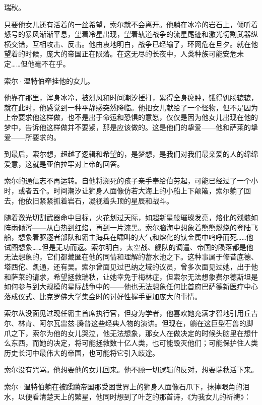 \documentclass[AutoFakeBold=true]{book}
\begin{document}
{\kaishu 瑞秋。}

只要他女儿还有活着的一丝希望，索尔就不会离开。他躺在冰冷的岩石上，倾听着怒号的暴风渐渐平息，望着冷星出现，望着轨道战争的流星尾迹和激光切割武器纵横交错，互相攻击、反击。他由衷地明白，战争已经输了，环网危在旦夕。就在他望着的时候，庞大的帝国正在陨落。在这无尽的长夜中，人类种族可能安危未定……但他毫不在乎。

索尔·温特伯牵挂他的女儿。

他靠在那里，浑身冰冷，被烈风和时间潮汐捶打，累得全身瘀肿，饿得饥肠辘辘，就在此时，他感觉到一种平静感突然降临。他把女儿献给了一个怪物，但不是因为上帝要求他这样做，也不是出于命运和恐惧的意愿，仅仅是因为他女儿出现在他的梦中，告诉他这样做并不要紧，那是应该做的。这是他们的挚爱——他和萨莱的挚爱——所要求的。

{\kaishu 到最后，索尔想，超越了逻辑和希望的，是梦想，是我们对我们最亲爱的人的绵绵爱意，这就是亚伯拉罕对上帝的回答。}

索尔的通信志不再运转。自他将濒死的孩子亲手奉给伯劳起，可能已经过了一个小时，或者五个。时间潮汐让狮身人面像仿若大海上的小船上下颠簸，索尔躺了回去，他依旧紧紧抓着岩石，凝视着头顶的星辰和战斗。

随着激光切割武器命中目标，火花划过天际，如超新星般璀璨发亮，熔化的残骸如阵雨倾泻——从白热到红焰，再到一片漆黑。索尔脑海中想象着熊熊燃烧的登陆飞船，想象着驱逐者部队和霸主海兵在啸叫的大气和熔化的钛金属中呜呼而死……他试图想象……但是无功而返。索尔明白，太空战、舰队的调遣、帝国的陨落都是他无法想象的，它们都藏匿在他的同情和理解的蓄水池之下。这种事属于修昔底德、塔西佗、凯通，还有吴。索尔曾面见过巴纳之域的议员，曾多次面见过她，出于他和萨莱的请求，希望拯救瑞秋，让她幸免于梅林症，但索尔无法想象费尔德斯坦是如何参与到大规模的星际战争中的——他也无法想象任何比首府巴萨德新医疗中心落成仪式、比克罗佛大学集会时的讨好性握手更加庞大的事情。

索尔从没面见过现任霸主首席执行官，但身为学者，他喜欢她充满才智地引用丘吉尔、林肯、阿尔瓦雷兹-腾普这些经典人物的演讲。但现在，躺在这巨型石兽的脚爪之下，索尔为他的女儿哭泣，他无法想象，那女人在做决定的时候头脑里在想什么东西，而她的决定，将可能拯救数十亿人类，也可能毁灭他们；可能保护住人类历史长河中最伟大的帝国，也可能将它引入歧途。

索尔没有咒骂。他想要他的女儿回来。他不顾一切逻辑的反对，想要瑞秋活下来。

索尔·温特伯躺在被蹂躏帝国那受困世界上的狮身人面像石爪下，抹掉眼角的泪水，以便看清楚天上的繁星，他同时想到了叶芝的那首诗，《为我女儿的祈祷》：
\end{document}
